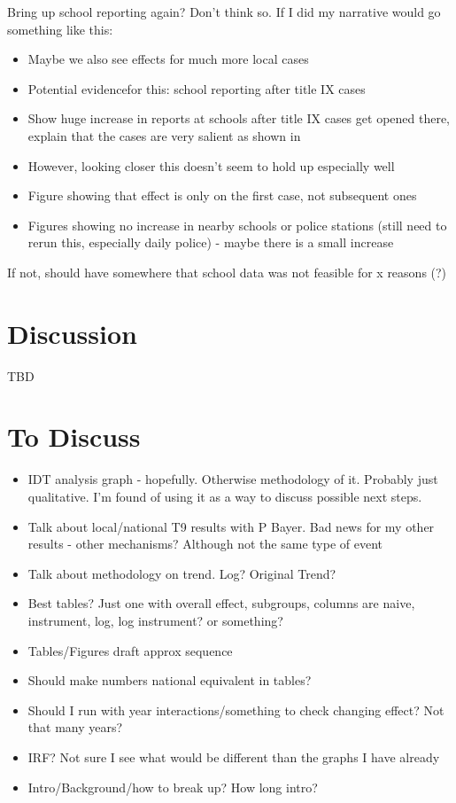 \documentclass[AER,draftmode]{AEA}
\begin{document}
Bring up school reporting again? Don't think so. If I did my narrative would go something like this:
\begin{itemize}
    \item Maybe we also see effects for much more local cases
    \item Potential evidencefor this: school reporting after title IX cases
    \item Show huge increase in reports at schools after title IX cases get opened there, explain that the cases are very salient as shown in 
    \item However, looking closer this doesn't seem to hold up especially well
    \item Figure showing that effect is only on the first case, not subsequent ones
    \item Figures showing no increase in nearby schools or police stations (still need to rerun this, especially daily police) - maybe there is a small increase
\end{itemize}
If not, should have somewhere that school data was not feasible for x reasons (?)
\section{Discussion}

TBD

\clearpage
\section{To Discuss}

\begin{itemize}
    \item IDT analysis graph - hopefully. Otherwise methodology of it. Probably just qualitative. I'm found of using it as a way to discuss possible next steps.
    \item Talk about local/national T9 results with P Bayer. Bad news for my other results - other mechanisms? Although not the same type of event
    \item Talk about methodology on trend. Log? Original Trend?
    \item Best tables? Just one with overall effect, subgroups, columns are naive, instrument, log, log instrument? or something?
    \item Tables/Figures draft approx sequence
    \item Should make numbers national equivalent in tables? 
    \item Should I run with year interactions/something to check changing effect? Not that many years?
    \item IRF? Not sure I see what would be different than the graphs I have already
    \item Intro/Background/how to break up? How long intro?
\end{itemize}
\end{document}
